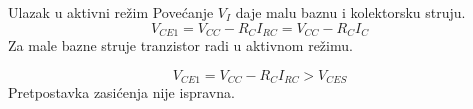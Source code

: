 \begin{frame}[label=10-s013]{Ulazak u aktivni režim}
\setlength{\abovedisplayskip}{4pt}\setlength{\belowdisplayskip}{4pt}\setlength{\abovedisplayshortskip}{3pt}\setlength{\belowdisplayshortskip}{3pt}
Povećanje $V_I$ daje malu baznu i kolektorsku struju.
\[V_{CE1}=V_{CC}-R_CI_{RC}=V_{CC}-R_CI_C\]
\bigskip
{}\medskip
Za male bazne struje tranzistor radi u aktivnom režimu.\par\bigskip
{}\medskip
\[V_{CE1}=V_{CC}-R_CI_{RC}>V_{CES}\]
Pretpostavka zasićenja nije ispravna.
\end{frame}
